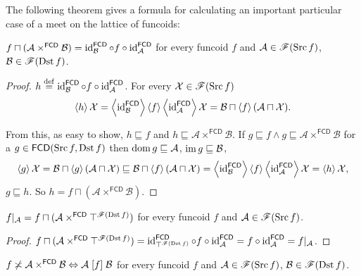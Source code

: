 The following theorem gives a formula for calculating an important
particular case of a meet on the lattice of funcoids:
\begin{thm}
$f\sqcap(\mathcal{A}\times^{\mathsf{FCD}}\mathcal{B})=\operatorname{id}_{\mathcal{B}}^{\mathsf
{FCD}}\circ f\circ\operatorname{id}_{\mathcal{A}}^{\mathsf{FCD}}$
for every funcoid $f$ and $\mathcal{A}\in\mathscr{F}(\operatorname{Src} f)$,
$\mathcal{B}\in\mathscr{F}(\operatorname{Dst} f)$.\end{thm}
\begin{proof}
$h\overset{\mathrm{def}}{=}\operatorname{id}_{\mathcal{B}}^{\mathsf{FCD}}\circ
f\circ\operatorname{id}_{\mathcal{A}}^{\mathsf{FCD}}$.
For every $\mathcal{X}\in\mathscr{F}(\operatorname{Src} f)$
\[
\left\langle h\right\rangle\mathcal{X}=\left\langle \operatorname{id}_{\mathcal{B}}^{\mathsf{FCD}}\right\rangle\left\langle f\right\rangle\left\langle \operatorname{id}_{\mathcal{A}}^{\mathsf{FCD}}\right\rangle\mathcal{X}=\mathcal{B}\sqcap\left\langle f\right\rangle(\mathcal{A}\sqcap\mathcal{X}).
\]


From this, as easy to show, $h\sqsubseteq f$ and
$h\sqsubseteq\mathcal{A}\times^{\mathsf{FCD}}\mathcal{B}$.
If $g\sqsubseteq f\land g\sqsubseteq\mathcal{A}\times^{\mathsf{FCD}}\mathcal{B}$
for a $g\in\mathsf{FCD}(\operatorname{Src} f,\operatorname{Dst} f)$ then $\operatorname{dom} g\sqsubseteq\mathcal{A}$,
$\operatorname{im} g\sqsubseteq\mathcal{B}$,
\[
\left\langle g\right\rangle\mathcal{X}=\mathcal{B}\sqcap\left\langle g\right\rangle(\mathcal{A}\sqcap\mathcal{X})\sqsubseteq\mathcal{B}\sqcap\left\langle f\right\rangle(\mathcal{A}\sqcap\mathcal{X})=\left\langle \operatorname{id}_{\mathcal{B}}^{\mathsf{FCD}}\right\rangle\left\langle f\right\rangle\left\langle \operatorname{id}_{\mathcal{A}}^{\mathsf{FCD}}\right\rangle\mathcal{X}=\left\langle h\right\rangle\mathcal{X},
\]
$g\sqsubseteq h$. So
$h=f\sqcap(\mathcal{A}\times^{\mathsf{FCD}}\mathcal{B})$.\end{proof}
\begin{cor}
$f|_{\mathcal{A}}=f\sqcap(\mathcal{A}\times^{\mathsf{FCD}}\top^{\mathscr{F}(\operatorname{Dst}
f)})$
for every funcoid $f$ and $\mathcal{A}\in\mathscr{F}(\operatorname{Src} f)$.\end{cor}
\begin{proof}
$f\sqcap(\mathcal{A}\times^{\mathsf{FCD}}\top^{\mathscr{F}(\operatorname{Dst}
f)})=\operatorname{id}_{\top^{\mathscr{F}(\operatorname{Dst} f)}}^{\mathsf{FCD}}\circ
f\circ\operatorname{id}_{\mathcal{A}}^{\mathsf{FCD}}=f\circ\operatorname{id}_{\mathcal{A}}^{\mathsf{FCD}}
=f|_{\mathcal{A}}$.\end{proof}
\begin{cor}
$f\not\asymp\mathcal{A}\times^{\mathsf{FCD}}\mathcal{B}\Leftrightarrow\mathcal{A}
\mathrel{\left[f\right]}\mathcal{B}$
for every funcoid $f$ and $\mathcal{A}\in\mathscr{F}(\operatorname{Src} f)$,
$\mathcal{B}\in\mathscr{F}(\operatorname{Dst} f)$.\end{cor}
